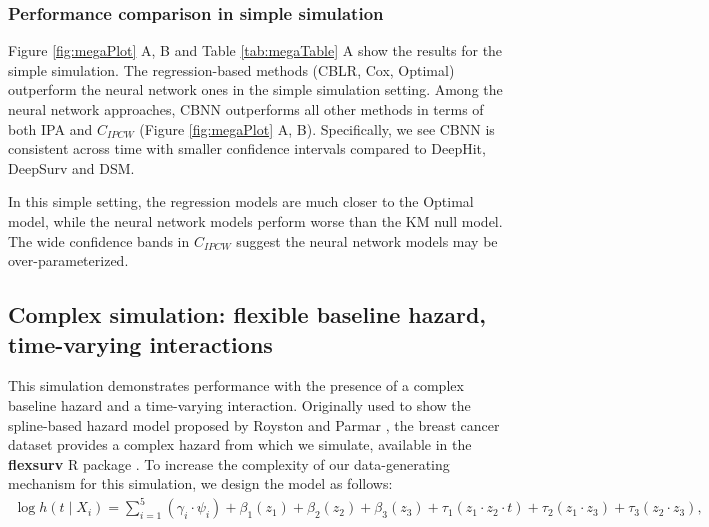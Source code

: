\documentclass[AMA,STIX1COL,]{WileyNJD-v2}
\begin{document}
\hypertarget{performance-comparison-in-simple-simulation}{%
\subsubsection{Performance comparison in simple
simulation}\label{performance-comparison-in-simple-simulation}}

Figure \ref{fig:megaPlot} A, B and Table \ref{tab:megaTable} A show the
results for the simple simulation. The regression-based methods (CBLR,
Cox, Optimal) outperform the neural network ones in the simple
simulation setting. Among the neural network approaches, CBNN
outperforms all other methods in terms of both IPA and \(C_{IPCW}\)
(Figure \ref{fig:megaPlot} A, B). Specifically, we see CBNN is
consistent across time with smaller confidence intervals compared to
DeepHit, DeepSurv and DSM.

In this simple setting, the regression models are much closer to the
Optimal model, while the neural network models perform worse than the KM
null model. The wide confidence bands in \(C_{IPCW}\) suggest the neural
network models may be over-parameterized.

\hypertarget{complex-simulation-flexible-baseline-hazard-time-varying-interactions}{%
\subsection{Complex simulation: flexible baseline hazard, time-varying
interactions}\label{complex-simulation-flexible-baseline-hazard-time-varying-interactions}}

This simulation demonstrates performance with the presence of a complex
baseline hazard and a time-varying interaction. Originally used to show
the spline-based hazard model proposed by Royston and Parmar
\citep{royston2002flexible}, the breast cancer dataset provides a
complex hazard from which we simulate, available in the
\textbf{flexsurv} R package \citep{flexsurv}. To increase the complexity
of our data-generating mechanism for this simulation, we design the
model as follows: \begin{align}
\log h(t \mid X_i) =\sum_{i=1}^{5} (\gamma_{i} \cdot \psi_{i}) + \beta_{{1}} (z_{1}) + \beta_{{2}} (z_{2})+ \beta_{{3}} (z_{3})+ \tau_{1} ( z_{1} \cdot z_{2} \cdot t)+ \tau_{2} ( z_{1} \cdot z_{3})+ \tau_{3} (z_{2} \cdot z_{3}), \nonumber
\end{align}
\end{document}
